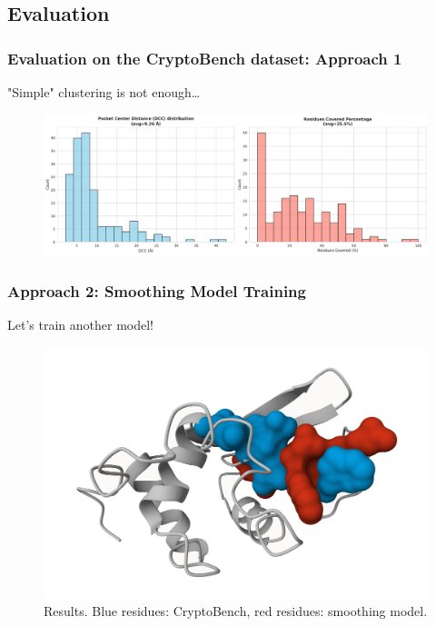 \documentclass[aspectratio=169]{beamer}
\begin{document}
\subsection{Evaluation}

\begin{frame}
  \frametitle{Evaluation on the CryptoBench dataset: Approach 1}

  "Simple" clustering is not enough\dots

  \begin{figure}
    \includegraphics[width=\textwidth]{fig/non-smoothened-1.pdf}
  \end{figure}
\end{frame}

\begin{frame}
  \frametitle{Approach 2: Smoothing Model Training}

  Let's train another model!

  \begin{figure}
    \centering
    \includegraphics[width=\linewidth,height=0.7\textheight,keepaspectratio]{fig/smoothing-difference.png}
    \caption{Results. \textcolor{ITMOblue}{Blue residues}: CryptoBench, \textcolor{ITMOred}{red residues}: smoothing model.}
  \end{figure}
\end{frame}
\end{document}
